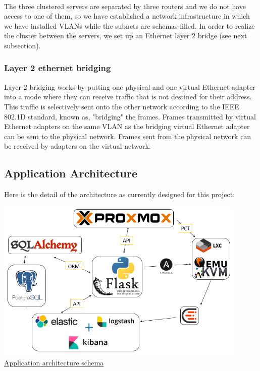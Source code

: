 \\
\vspace{1cm}
The three clustered servers are separated by three routers and we do not have access to one of them, so we have established a network infrastructure in which we have installed VLANs while the subnets are schemas-filled. In order to realize the cluster between the servers, we set up an Ethernet layer 2 bridge (see next subsection).

\vspace{1cm}
\subsubsection{Layer 2 ethernet bridging}

Layer-2 bridging works by putting one physical and one virtual Ethernet adapter into a mode where they can receive traffic that is not destined for their address. This traffic is selectively sent onto the other network according to the IEEE 802.1D standard, known as, "bridging" the frames. Frames transmitted by virtual Ethernet adapters on the same VLAN as the bridging virtual Ethernet adapter can be sent to the physical network. Frames sent from the physical network can be received by adapters on the virtual network. 

\pagebreak

\subsection{Application Architecture}

Here is the detail of the architecture as currently designed for this project:
\vspace{1cm}
\begin{center}
\includegraphics[width=0.90\textwidth]{images/schema.png}
\\
\underline{Application architecture schema}
\end{center}

